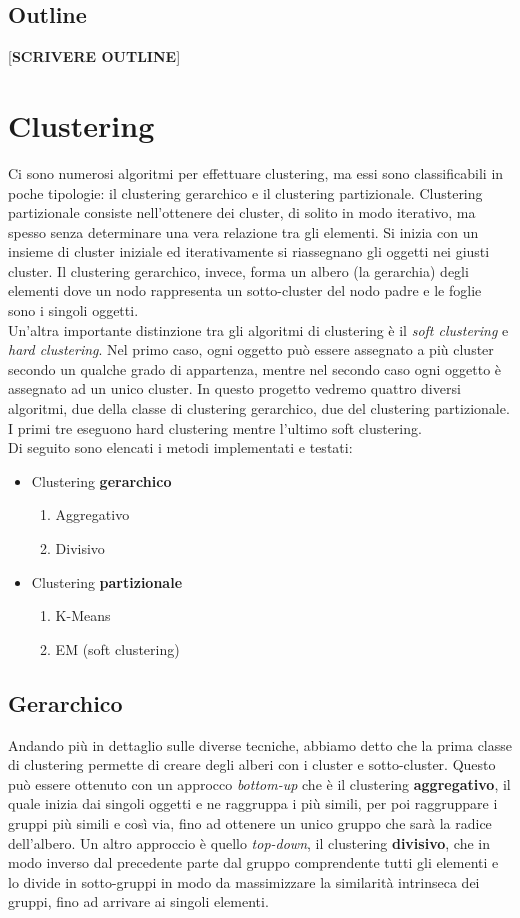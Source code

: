 \documentclass{llncs}
\newcommand{\acapo}{\vspace{0.5\baselineskip}\\}
\begin{document}
	\subsection{Outline}
	[\textbf{SCRIVERE OUTLINE}]
	\section{Clustering}
	Ci sono numerosi algoritmi per effettuare clustering, ma essi sono classificabili in poche tipologie: il clustering gerarchico e il clustering partizionale.
	Clustering partizionale consiste nell'ottenere dei cluster, di solito in modo iterativo, ma spesso senza determinare una vera relazione tra gli elementi. Si inizia con un insieme di cluster iniziale ed iterativamente
	si riassegnano gli oggetti nei giusti cluster. Il clustering gerarchico, invece, forma un albero (la gerarchia) degli elementi dove un nodo rappresenta un sotto-cluster del nodo padre e le foglie sono i singoli
	oggetti.
	\acapo
	Un'altra importante distinzione tra gli algoritmi di clustering è il \textit{soft clustering} e \textit{hard clustering}. Nel primo caso, ogni oggetto può essere assegnato a più cluster secondo un qualche
	grado di appartenza, mentre nel secondo caso ogni oggetto è assegnato ad un unico cluster. In questo progetto vedremo quattro diversi algoritmi, due della classe di clustering gerarchico, due del clustering partizionale.
	I primi tre eseguono hard clustering mentre l'ultimo soft clustering.
	\acapo
	Di seguito sono elencati i metodi implementati e testati:
	\begin{itemize}
		\item Clustering \textbf{gerarchico}
		\begin{enumerate}
			\item Aggregativo
			\item Divisivo
		\end{enumerate}

		\item Clustering \textbf{partizionale}
		\begin{enumerate}
			\item K-Means
			\item EM (soft clustering)
		\end{enumerate}
	\end{itemize}
	
	\subsection{Gerarchico}
	Andando più in dettaglio sulle diverse tecniche, abbiamo detto che la prima classe di clustering permette di creare degli alberi con i cluster e sotto-cluster. 
	Questo può essere ottenuto con un approcco \textit{bottom-up} che è il clustering \textbf{aggregativo},
	il quale inizia dai singoli oggetti e ne raggruppa i più simili, per poi raggruppare i gruppi più simili e così via, fino ad ottenere un unico gruppo
	che sarà la radice dell'albero. Un altro approccio è quello \textit{top-down}, il clustering \textbf{divisivo}, che in modo inverso dal precedente parte 
	dal gruppo comprendente tutti gli elementi e lo divide in sotto-gruppi in modo da massimizzare la similarità intrinseca dei gruppi, 
	fino ad arrivare ai singoli elementi.
\end{document}

